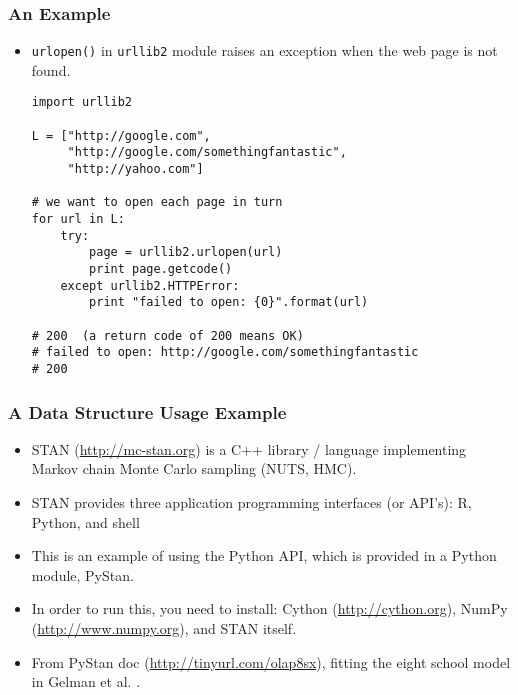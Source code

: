 \documentclass{beamer}
\begin{document}
\begin{frame}[fragile]
\frametitle{An Example}
\begin{itemize}
\item \lstinline{urlopen()} in \lstinline{urllib2}
      module raises
      an exception when the web page is not found.
\begin{lstlisting}
import urllib2

L = ["http://google.com",
     "http://google.com/somethingfantastic",
     "http://yahoo.com"]

# we want to open each page in turn
for url in L:
    try:
        page = urllib2.urlopen(url)
        print page.getcode()
    except urllib2.HTTPError:
        print "failed to open: {0}".format(url)

# 200  (a return code of 200 means OK)
# failed to open: http://google.com/somethingfantastic
# 200 
\end{lstlisting}
\end{itemize}
\end{frame}

\begin{frame}[fragile]
\frametitle{A Data Structure Usage Example}
\begin{itemize}
\item STAN (\url{http://mc-stan.org}) is  
      a C++ library / language implementing
      Markov chain Monte Carlo sampling (NUTS, HMC).
\item STAN provides
      three application programming interfaces 
      (or API's): R, Python, and shell
\item This is an example of using the Python API,
      which is provided in a Python module, PyStan\cite{STANSite}.
\item In order to run this, you need to install: 
      Cython (\url{http://cython.org}), NumPy 
      (\url{http://www.numpy.org}), and STAN itself.
\item From PyStan doc (\url{http://tinyurl.com/olap8sx}),
      fitting the eight school model in Gelman et al.
      \cite[sec 5.5]{GelmanEtAl2003}.
\end{itemize}
\end{frame}
\end{document}
